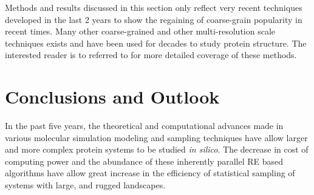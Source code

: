 \documentclass[12pt]{article}
\numberwithin{equation}{subsection}
\begin{document}
\begin{spacing}{1}
Methods and results discussed in this section only reflect very recent techniques developed in the last 2 years to show the regaining of coarse-grain popularity in recent times. Many other coarse-grained and other multi-resolution scale techniques exists and have been used for decades to study protein structure. The interested reader is to referred to \cite{dok06, voth} for more detailed coverage of these methods.

\section{Conclusions and Outlook}
In the past five years, the theoretical and computational advances made in various molecular simulation modeling and sampling techniques have allow larger and more complex protein systems to be studied \textit{in silico}.  The decrease in cost of computing power and the abundance of these inherently parallel RE based algorithms have allow great increase in the efficiency of statistical sampling of systems with large, and rugged landscapes.


\end{spacing}
\end{document}

